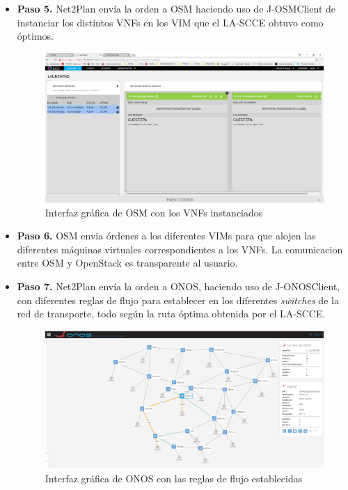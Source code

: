 \begin{itemize}
	\item \textbf{Paso 5.} Net2Plan envía la orden a \ac{OSM} haciendo uso de J-OSMClient de instanciar los distintos \acp{VNF} en los \ac{VIM} que el \ac{LA-SCCE} obtuvo como óptimos.
	
	\begin{figure}[!ht]
		\centering
		\includegraphics[width=0.9\linewidth]{imagenes/osm_vnfs}
		\caption{Interfaz gráfica de \ac{OSM} con los \acp{VNF} instanciados}
		\label{fig:osmvnfs}
	\end{figure}
	
	
	\item \textbf{Paso 6.} \ac{OSM} envia órdenes a los diferentes \acp{VIM} para que alojen las diferentes máquinas virtuales correspondientes a los \acp{VNF}. La comunicacion entre \ac{OSM} y OpenStack es transparente al usuario.
	
	\item \textbf{Paso 7.} Net2Plan envía la orden a \ac{ONOS}, haciendo uso de J-ONOSClient, con diferentes reglas de flujo para establecer en los diferentes \textit{switches} de la red de transporte, todo según la ruta óptima obtenida por el \ac{LA-SCCE}.
	
	\begin{figure}[!ht]
		\centering
		\includegraphics[width=0.9\linewidth]{imagenes/topo_onos}
		\caption{Interfaz gráfica de \ac{ONOS} con las reglas de flujo establecidas}
		\label{fig:topo_onos}
	\end{figure}


\end{itemize}

